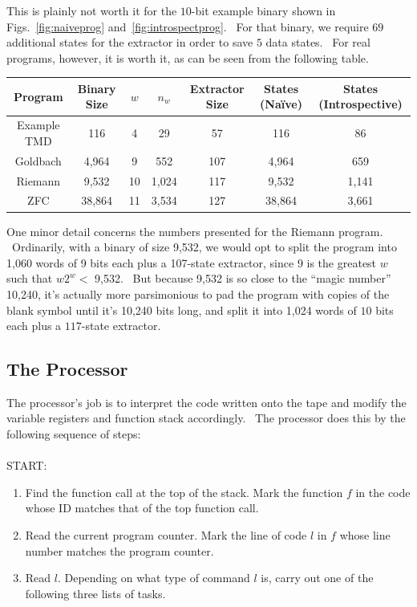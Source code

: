 \documentclass[11pt]{article}
\begin{document}
This is plainly not worth it for the $10$-bit example binary shown in Figs.~\ref{fig:naiveprog} and~\ref{fig:introspectprog}. \ For that binary, we require $69$ additional states for the extractor in order to save $5$ data states. \ For real programs, however, it is worth it, as can be seen from the following table.

\begin{center}
    \begin{tabular}{||c c c c c c c||}
    \hline
    Program & Binary Size & $w$ & $n_w$ & Extractor Size & States (Na\"ive) & States (Introspective) \\ [0.5ex]
    \hline\hline
    Example TMD & 116 & 4 & 29 & 57 & 116 & 86 \\
    \hline
    Goldbach & 4,964 & 9 & 552 & 107 & 4,964 & 659 \\
    \hline
    Riemann & 9,532 & 10 & 1,024 & 117 & 9,532 & 1,141 \\
    \hline
    ZFC & 38,864 & 11 & 3,534 & 127 & 38,864 & 3,661 \\
    \hline
    \end{tabular}
\end{center}

One minor detail concerns the numbers presented for the Riemann program. \ Ordinarily, with a binary of size 9,532, we would opt to split the program into 1,060 words of 9 bits each plus a 107-state extractor, since 9 is the greatest $w$ such that $w2^w <$ 9,532. \ But because 9,532 is so close to the ``magic number'' 10,240, it's actually more parsimonious to pad the program with copies of the blank symbol until it's 10,240 bits long, and split it into 1,024 words of $10$ bits each plus a $117$-state extractor.


\subsection{The Processor}

The processor's job is to interpret the code written onto the tape and modify the variable registers and function stack accordingly. \ The processor does this by the following sequence of steps:  \\ \\
START:
\begin{enumerate}
\item Find the function call at the top of the stack. Mark the function $f$ in the code whose ID matches that of the top function call.
\item Read the current program counter. Mark the line of code $l$ in $f$ whose line number matches the program counter.
\item Read $l$. Depending on what type of command $l$ is, carry out one of the following three lists of tasks.
\end{enumerate}
\end{document}
